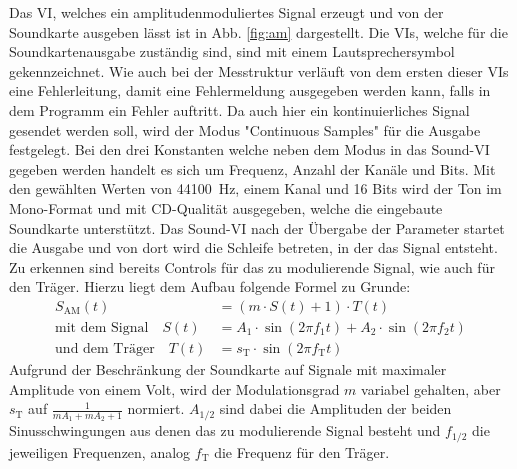 		Das VI, welches ein amplitudenmoduliertes Signal erzeugt und von der Soundkarte ausgeben lässt ist in Abb. \ref{fig:am} dargestellt.
		Die VIs, welche für die Soundkartenausgabe zuständig sind, sind mit einem Lautsprechersymbol gekennzeichnet. 
		Wie auch bei der Messtruktur verläuft von dem ersten dieser VIs eine Fehlerleitung, damit eine Fehlermeldung ausgegeben werden kann, falls in dem Programm ein Fehler auftritt.
		Da auch hier ein kontinuierliches Signal gesendet werden soll, wird der Modus "Continuous Samples" für die Ausgabe festgelegt.
		Bei den drei Konstanten welche neben dem Modus in das Sound-VI gegeben werden handelt es sich um Frequenz, Anzahl der Kanäle und Bits.
		Mit den gewählten Werten von \SI{44100}{\hertz}, einem Kanal und 16 Bits wird der Ton im Mono-Format und mit CD-Qualität ausgegeben, welche die eingebaute Soundkarte unterstützt.
		Das Sound-VI nach der Übergabe der Parameter startet die Ausgabe und von dort wird die Schleife betreten, in der das Signal entsteht.
		Zu erkennen sind bereits Controls für das zu modulierende Signal, wie auch für den Träger.
		Hierzu liegt dem Aufbau folgende Formel zu Grunde:
		\begin{align}
			\label{eq:AM1} S_\text{AM}(t) &= (m \cdot S(t) + 1) \cdot T(t) \\
			\label{eq:AM2} \text{mit dem Signal} \quad S(t) &= A_1 \cdot \sin{(2\pi f_1 t)} + A_2 \cdot \sin{(2\pi f_2 t)}\\
			\label{eq:AM3} \text{und dem Träger} \quad T(t) &= s_\text{T} \cdot \sin{(2\pi f_\text{T} t)}
		\end{align} 
		Aufgrund der Beschränkung der Soundkarte auf Signale mit maximaler Amplitude von einem Volt, wird der Modulationsgrad $m$ variabel gehalten, aber $s_\text{T}$ auf $\frac{1}{mA_1 + mA_2 + 1}$ normiert. 
		$A_{1/2}$ sind dabei die Amplituden der beiden Sinusschwingungen aus denen das zu modulierende Signal besteht und $f_{1/2}$ die jeweiligen Frequenzen, analog $f_\text{T}$ die Frequenz für den Träger.
		
